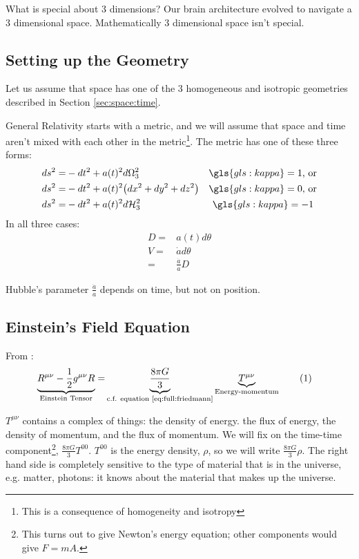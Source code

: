 \documentclass[]{article}
\newcommand\numberthis{\addtocounter{equation}{1}\tag{\theequation}}
\begin{document}
What is special about 3 dimensions? Our brain architecture evolved to navigate a 3 dimensional space. Mathematically 3 dimensional space isn't special.

\subsection{Setting up the Geometry}


Let us assume that space has one of the 3 homogeneous and isotropic geometries described in Section \ref{sec:space:time}.

General Relativity starts with a metric, and we will assume that space and time aren't mixed with each other in the metric\footnote{This is a consequence of homogeneity and isotropy}. The metric has one of these three forms:
\begin{align*}
	ds^2 =& - dt^2 + a(t)^2 d\Omega_3^2 &\gls{gls:kappa}=1\text{, or}\\
	ds^2 =& - dt^2 + a(t)^2 \big(dx^2 + dy^2 +dz^2\big) &\gls{gls:kappa}=0\text{, or}\\
	ds^2 =& - dt^2 + a(t)^2 d\mathcal{H}_3^2 &\gls{gls:kappa}=-1	\text{ }
\end{align*}
In all three cases:
\begin{align*}
	D =& a(t) d\theta\\
	V =&  \dot{a} d\theta\\
	=& \frac{\dot{a}}{a}D	
\end{align*}

Hubble's parameter $\frac{\dot{a}}{a}$ depends on time, but not on position.

\subsection{Einstein's Field Equation}

From \cite[General Relativity, Lecture 9]{susskind2007theoretical}:
\begin{align*}
	\underbrace{R^{\mu\nu} - \frac{1}{2}g^{\mu\nu}R}_\text{Einstein Tensor}=&\underbrace{\frac{8\pi G}{3}}_\text{c.f. equation \eqref{eq:full:friedmann}}\underbrace{ T^{\mu\nu}}_\text{Energy-momentum} \numberthis \label{eq:einstein:field}
\end{align*}

$T^{\mu\nu}$ contains a complex of things: the density of energy. the flux of energy, the density of momentum, and the flux of momentum. We will fix on the time-time component\footnote{This turns out to give Newton's energy equation; other components would give $F=mA$.}, $\frac{8\pi G}{3} T^{00}$. $T^{00}$ is the energy density, $\rho$, so we will write $\frac{8\pi G}{3} \rho$. The right hand side is completely sensitive to the type of material that is in the universe, e.g. matter, photons: it knows about the material that makes up the universe.
\end{document}
